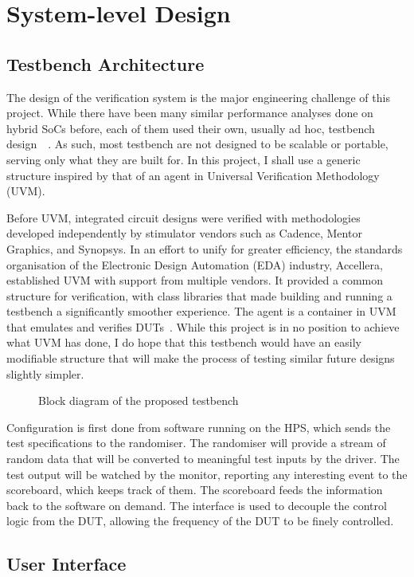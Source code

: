 \section{System-level Design}

\subsection{Testbench Architecture}
The design of the verification system is the major engineering challenge of this project.
While there have been many similar performance analyses done on hybrid SoCs before, each of them used their own, usually ad hoc, testbench design~\cite{Shi1}~\cite{Li1}.
As such, most testbench are not designed to be scalable or portable, serving only what they are built for.
In this project, I shall use a generic structure inspired by that of an agent in Universal Verification Methodology (UVM).

Before UVM, integrated circuit designs were verified with methodologies developed independently by stimulator vendors such as Cadence, Mentor Graphics, and Synopsys.
In an effort to unify for greater efficiency, the standards organisation of the Electronic Design Automation (EDA) industry, Accellera, established UVM with support from multiple vendors.
It provided a common structure for verification, with class libraries that made building and running a testbench a significantly smoother experience.
The agent is a container in UVM that emulates and verifies DUTs~\cite{Accellera1}.
While this project is in no position to achieve what UVM has done, I do hope that this testbench would have an easily modifiable structure that will make the process of testing similar future designs slightly simpler.

\begin{figure}[H]
  \centering
  
  \caption{Block diagram of the proposed testbench}
  \label{Block}
\end{figure}

Configuration is first done from software running on the HPS, which sends the test specifications to the randomiser.
The randomiser will provide a stream of random data that will be converted to meaningful test inputs by the driver.
The test output will be watched by the monitor, reporting any interesting event to the scoreboard, which keeps track of them.
The scoreboard feeds the information back to the software on demand.
The interface is used to decouple the control logic from the DUT, allowing the frequency of the DUT to be finely controlled.

\subsection{User Interface}
